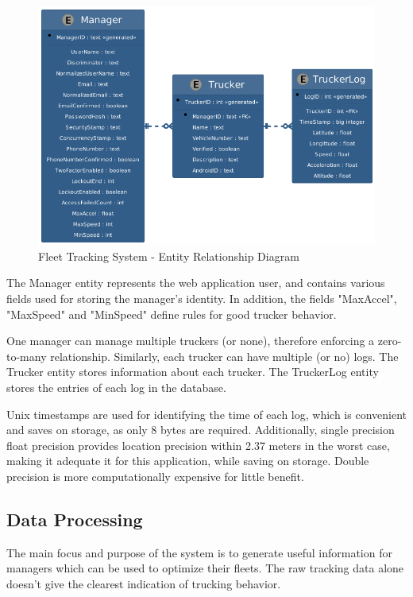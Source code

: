 \begin{figure}[H]
\centering
\includegraphics[scale=0.5]{../diag/erd.png}
\caption{Fleet Tracking System - Entity Relationship Diagram}
\label{fig:erd}
\end{figure}

The Manager entity represents the web application user, and contains various fields used for storing the manager's identity.
In addition, the fields "MaxAccel", "MaxSpeed" and "MinSpeed" define rules for good trucker behavior.

One manager can manage multiple truckers (or none), therefore enforcing a zero-to-many relationship.
Similarly, each trucker can have multiple (or no) logs.
The Trucker entity stores information about each trucker.
The TruckerLog entity stores the entries of each log in the database.

Unix timestamps are used for identifying the time of each log, which is convenient and saves on storage, as only 8 bytes are required.
Additionally, single precision float precision provides location precision within 2.37 meters\cite{noauthor_required_nodate} in the worst case, making it adequate it for this application, while saving on storage. Double precision is more computationally expensive for little benefit.

\subsection{Data Processing}
The main focus and purpose of the system is to generate useful information for managers which can be used to optimize their fleets.
The raw tracking data alone doesn't give the clearest indication of trucking behavior.

